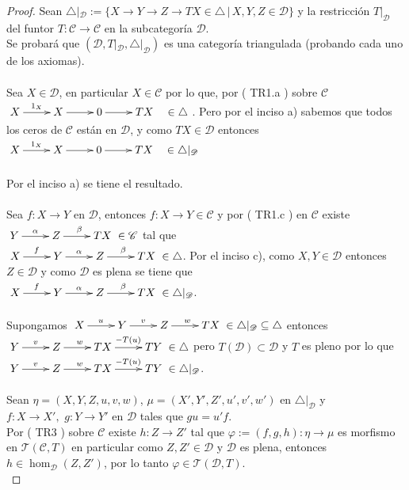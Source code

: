 \documentclass{article}
\begin{document}
\begin{enumerate}[label=\textbf{Ej \arabic*.}]
\begin{proof}
			 Sean $\triangle|_{\mathscr{D}}:=\{X\to Y\to Z\to TX\in \triangle\,|\, X,Y,Z\in \mathscr{D}\}$ y la restricción $T|_{\mathscr{D}}$ del
			funtor $T:\mathscr{C}\longrightarrow \mathscr{C}$ en la subcategoría $\mathscr{D}$.\\
			
			Se probará que $(\mathscr{D},T|_{\mathscr{D}},\triangle|_{\mathscr{D}})$ es una categoría triangulada (probando cada uno de los axiomas).\\
			
			\\
			Sea $X\in \mathscr{D}$, en particular  $X\in \mathscr{C}$ por lo que, por ( TR1.a ) sobre $\mathscr{C}$
			\\$\xymatrix{X\ar[r]^{1_X}&X\ar[r]&0\ar[r]&TX\quad\in \triangle}$.
			Pero por el inciso a) sabemos que todos los ceros de $\mathscr{C}$ están en $\mathscr{D}$, y como $TX\in \mathscr{D}$  entonces \\
			$\xymatrix{X\ar[r]^{1_X}&X\ar[r]&0\ar[r]&TX\quad\in \triangle|_{\mathscr{D}}}$\\
			
			\\
			Por el inciso a) se tiene el resultado.\\
			
			\\
			Sea $f:X\to Y$ en $\mathscr{D}$, entonces $f:X\to Y\in \mathscr{C}$ y por ( TR1.c ) en $\mathscr{C}$ existe
			$\xymatrix{Y\ar[r]^{\alpha}&Z\ar[r]^{\beta}&TX}\in \mathscr{C}$ tal que \\
			$\xymatrix{X\ar[r]^{f}&Y\ar[r]^{\alpha}&Z\ar[r]^{\beta}&TX}\in \triangle$. Por el inciso c), como $X,Y\in \mathscr{D}$ entonces $Z\in \mathscr{D}$
			y como $\mathscr{D}$ es plena se tiene que \\$\xymatrix{X\ar[r]^{f}&Y\ar[r]^{\alpha}&Z\ar[r]^{\beta}&TX}\in \triangle|_{\mathscr{D}}$.\\
			
			\\
			Supongamos $\xymatrix{X\ar[r]^{u}&Y\ar[r]^{v}&Z\ar[r]^{w}&TX}\in \triangle|_{\mathscr{D}}\subseteq \triangle$ entonces \\
			$\xymatrix{Y\ar[r]^{v}&Z\ar[r]^{w}&TX\ar[r]^{-T(u)}&TY}\in \triangle$ pero $T(\mathscr{D})\subset \mathscr{D}$ y $T$ es pleno por lo que 
			$\xymatrix{Y\ar[r]^{v}&Z\ar[r]^{w}&TX\ar[r]^{-T(u)}&TY}\in \triangle|_{\mathscr{D}}$.\\
			
			\\
			Sean $\eta=(X,Y,Z,u,v,w)$, $\mu=(X',Y',Z',u',v',w')$ en $\triangle|_{\mathscr{D}}$ y\\$f:X\to X',\,\, g:Y\to Y'$ en $\mathscr{D}$ tales que $gu=u'f$.\\
			Por ( TR3 ) sobre $\mathscr{C}$ existe $h:Z\to Z'$ tal que $\varphi:=(f,g,h):\eta\to \mu$ es morfismo en $\mathscr{T}(\mathscr{C},T)$ en particular
			como $Z,Z'\in \mathscr{D}$ y $\mathscr{D}$ es plena, entonces $h\in \hom_{\mathscr{D}}(Z,Z')$, por lo tanto $\varphi\in \mathscr{T}(\mathscr{D},T)$.
			\\
			

\end{proof}
\end{enumerate}
\end{document}

